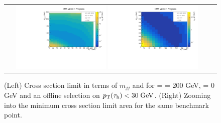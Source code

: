 \begin{figure}[tbh!]
	\centering
	\begin{tabular}{cc}
		\includegraphics[width=0.45\textwidth]{analysis/pics/JetInvMass_vs_MET_xsec_chi200_lsp000_taupt30.pdf}
		\includegraphics[width=0.45\textwidth]{analysis/pics/JetInvMass_vs_MET_xsec_chi200_lsp000_taupt30_zoom.pdf} 		
	\end{tabular}
	\caption{(Left) Cross section limit in terms of $m_{jj}$ and \met for \charginopm = \neutralinotwo = 200 GeV, \neutralinoone = 0 GeV and an offline selection on $p_{\text{T}}(\tau_{\text{h}}) <  30\;\text{Ge}\kern-0.06667em\text{V}$. (Right) Zooming into the minimum cross section limit area for the same benchmark point.}
	\label{fig::JetInvMass_vs_MET_xsec_chi200_lsp000_taupt30}
\end{figure}

